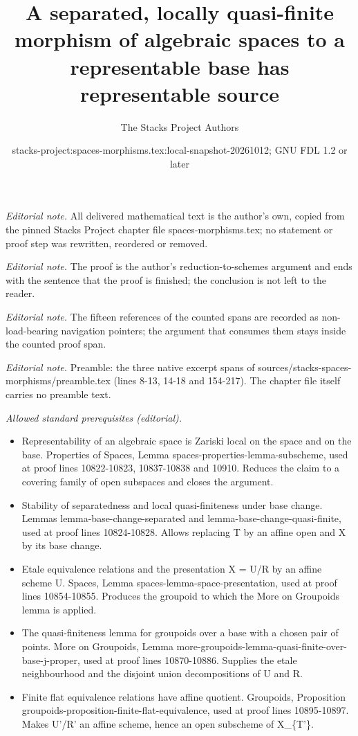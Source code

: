 \documentclass[10pt,a4paper]{amsart}
\title{A separated, locally quasi-finite morphism of algebraic spaces to a representable base has representable source}
\author{The Stacks Project Authors}
\date{stacks-project:spaces-morphisms.tex:local-snapshot-20261012; GNU FDL 1.2 or later}
\theoremstyle{plain}
\theoremstyle{definition}
\theoremstyle{remark}
\numberwithin{equation}{subsection}
\begin{document}
\maketitle
\setcounter{subsection}{1}
\noindent\textit{Editorial note.} All delivered mathematical text is the author's own, copied from the pinned Stacks Project chapter file spaces-morphisms.tex; no statement or proof step was rewritten, reordered or removed.\par\medskip
\noindent\textit{Editorial note.} The proof is the author's reduction-to-schemes argument and ends with the sentence that the proof is finished; the conclusion is not left to the reader.\par\medskip
\noindent\textit{Editorial note.} The fifteen references of the counted spans are recorded as non-load-bearing navigation pointers; the argument that consumes them stays inside the counted proof span.\par\medskip
\noindent\textit{Editorial note.} Preamble: the three native excerpt spans of sources/stacks-spaces-morphisms/preamble.tex (lines 8-13, 14-18 and 154-217). The chapter file itself carries no preamble text.\par\medskip
\noindent\textit{Allowed standard prerequisites (editorial).}\begin{itemize}
\item Representability of an algebraic space is Zariski local on the space and on the base. Properties of Spaces, Lemma spaces-properties-lemma-subscheme, used at proof lines 10822-10823, 10837-10838 and 10910. Reduces the claim to a covering family of open subspaces and closes the argument.
\item Stability of separatedness and local quasi-finiteness under base change. Lemmas lemma-base-change-separated and lemma-base-change-quasi-finite, used at proof lines 10824-10828. Allows replacing T by an affine open and X by its base change.
\item Etale equivalence relations and the presentation X = U/R by an affine scheme U. Spaces, Lemma spaces-lemma-space-presentation, used at proof lines 10854-10855. Produces the groupoid to which the More on Groupoids lemma is applied.
\item The quasi-finiteness lemma for groupoids over a base with a chosen pair of points. More on Groupoids, Lemma more-groupoids-lemma-quasi-finite-over-base-j-proper, used at proof lines 10870-10886. Supplies the etale neighbourhood and the disjoint union decompositions of U and R.
\item Finite flat equivalence relations have affine quotient. Groupoids, Proposition groupoids-proposition-finite-flat-equivalence, used at proof lines 10895-10897. Makes U'/R' an affine scheme, hence an open subscheme of X\_\{T'\}.
\end{itemize}\medskip
\end{document}
